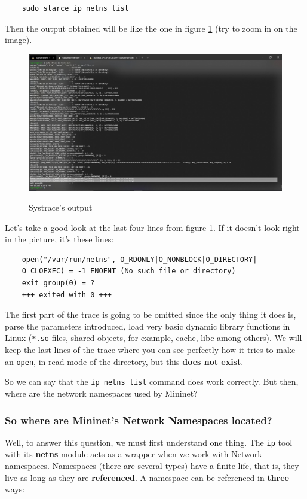 \documentclass[12pt]{article}
\newcommand{\newpar} {
    \vskip 1cm
}
\begin{document}
			\begin{verbatim}
	sudo starce ip netns list
			\end{verbatim}

			Then the output obtained will be like the one in figure \ref{f:sys_trace} (try to zoom in on the image).

			\begin{figure}[!htb]
				\centering
				\includegraphics[width=\linewidth]{sys_trace.jpg}
				\label{f:sys_trace}
				\caption{Systrace's output}
			\end{figure}

			Let's take a good look at the last four lines from figure \ref{f:sys_trace}. If it doesn't look right in the picture, it's these lines:

			\begin{verbatim}
	open("/var/run/netns", O_RDONLY|O_NONBLOCK|O_DIRECTORY|
	O_CLOEXEC) = -1 ENOENT (No such file or directory)
	exit_group(0) = ?
	+++ exited with 0 +++
			\end{verbatim}

			The first part of the trace is going to be omitted since the only thing it does is, parse the parameters introduced, load very basic dynamic library functions in Linux (\texttt{*.so} files, shared objects, for example, cache, libc among others). We will keep the last lines of the trace where you can see perfectly how it tries to make an \texttt{open}, in read mode of the directory, but this \textbf{does not exist}.
			\newpar
			So we can say that the \texttt{ip netns list} command does work correctly. But then, where are the network namespaces used by Mininet?

		\subsubsection{So where are Mininet's Network Namespaces located?}
			Well, to answer this question, we must first understand one thing. The \texttt{ip} tool with its \textbf{netns} module acts as a wrapper when we work with Network namespaces. Namespaces (there are several \href{http://man7.org/linux/man-pages/man7/network_namespaces.7.html}{types}) have a finite life, that is, they live as long as they are \textbf{referenced}. A namespace can be referenced in \textbf{three} ways:
\end{document}
